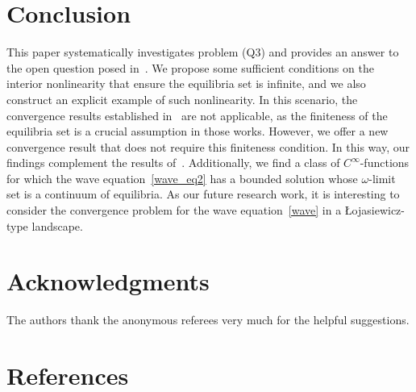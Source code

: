 \documentclass{elsarticle}
\begin{document}
\section{Conclusion}
\label{sec:conclusion}
This paper systematically investigates problem (Q3) and provides an answer to the open question posed in~\cite{rodrigues2022}. We propose some sufficient conditions on the interior nonlinearity that ensure the equilibria set is infinite, and we also construct an explicit example of such nonlinearity. In this scenario, the convergence results established in~\cite{CEL2002, chueshov2004} are not applicable, as the finiteness of the equilibria set is a crucial assumption in those works. However, we offer a new convergence result that does not require this finiteness condition. In this way, our findings complement the results of~\cite{CEL2002, chueshov2004}. Additionally, we find a class of $C^\infty$-functions for which the wave equation~\eqref{wave_eq2} has a bounded solution whose $\omega$-limit set is a continuum of equilibria. As our future research work, it is interesting to consider the convergence problem for the wave equation~\eqref{wave} in a {\L}ojasiewicz-type landscape.

\section*{Acknowledgments}
The authors thank the anonymous referees very much for the helpful suggestions.

\section*{References}


\end{document}
